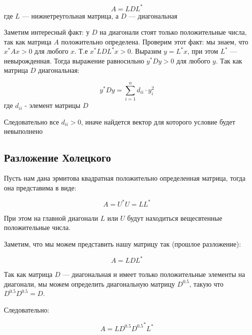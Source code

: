 \documentclass{article}
\begin{document}
    \begin{equation}
        A = LDL^{*}
    \end{equation}
    где $L$ --- нижнетреугольная матрица, а $D$ --- диагональная 

    \quad 

    Заметим интересный факт: у $D$ на диагонали стоят только положительные числа, так как матрица $A$ положительно определена. 
    Проверим этот факт: мы знаем, что $x^{*} A x > 0$ для любого $x$. Т.е $x^{*} LDL^{*} x > 0$. 
    Выразим $y = L^{*}x$, при этом $L^{*}$ --- невырожденная. Тогда выражение равносильно $y^{*}D y > 0$ для любого $y$.
    Так как матрица $D$ диагональная: 

    \begin{equation}
        y^{*}D y = \sum_{i=1}^{n}{d_{ii} \cdot y_{i}^{2}}
    \end{equation}
    где $d_{ii}$ - элемент матрицы $D$

    Следовательно все $d_{ii} > 0$, иначе найдется вектор для которого условие будет невыполнено 


    \subsection{Разложение Холецкого}

    Пусть нам дана эрмитова квадратная положительно определенная матрица, тогда она представима в виде: 

    \begin{equation}
        A = U^{*}U = L L^{*}
    \end{equation}

    \quad 
    
    При этом на главной диагонали $L$ или $U$ будут находиться вещесвтенные положительные числа.

    \quad 

    Заметим, что мы можем представить нашу матрицу так (прошлое разложение): 

    \begin{equation}
        A = L D L^{*}
    \end{equation}

    Так как матрица $D$ --- диагональная и имеет только положительные элементы на диагонали, 
    мы можем определить диагональную матрицу $D^{0.5}$, такую что $D^{0.5} D^{0.5} = D$.

    \quad 

    Следовательно: 

    \begin{equation}
        A = L D^{0.5} {D^{0.5}}^{*} L^{*}
    \end{equation}
\end{document}
